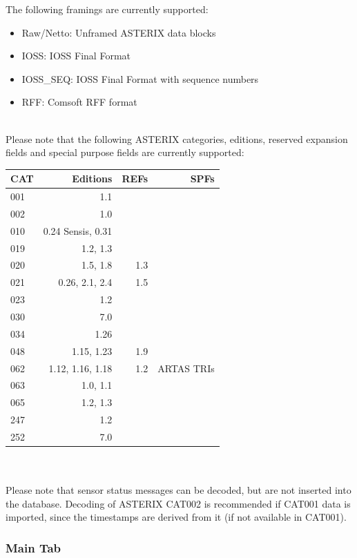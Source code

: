 The following framings are currently supported:

\begin{itemize}
\item Raw/Netto: Unframed ASTERIX data blocks
\item IOSS: IOSS Final Format
\item IOSS\_SEQ: IOSS Final Format with sequence numbers
\item RFF: Comsoft RFF format
\end{itemize}
\ \\

Please note that the following ASTERIX categories, editions, reserved expansion fields and special purpose fields are currently supported: \\

\begin{tabular}{ | l | r | r | r |}
\hline
  CAT & Editions & REFs & SPFs  \\ \hline
  001 & 1.1 &  &  \\ \hline
  002 & 1.0 &  &  \\ \hline
  010 & 0.24 Sensis, 0.31  &  &  \\ \hline
  019 & 1.2, 1.3 & & \\ \hline
  020 & 1.5, 1.8 & 1.3 & \\ \hline
  021 & 0.26, 2.1, 2.4 & 1.5 & \\ \hline
  023 & 1.2 & & \\ \hline
  030 & 7.0 & & \\ \hline
  034 & 1.26 & & \\ \hline
  048 & 1.15, 1.23 & 1.9 & \\ \hline
  062 & 1.12, 1.16, 1.18 & 1.2 & ARTAS TRIs \\ \hline
  063 & 1.0, 1.1 & & \\ \hline
  065 & 1.2, 1.3 & & \\ \hline
  247 & 1.2 & & \\ \hline
  252 & 7.0 & & \\ \hline
\end{tabular} \\
\  \\

Please note that sensor status messages can be decoded, but are not inserted into the database. 
Decoding of ASTERIX CAT002 is recommended if CAT001 data is imported, since the timestamps are derived from it (if not available in CAT001).

\subsubsection{Main Tab}

